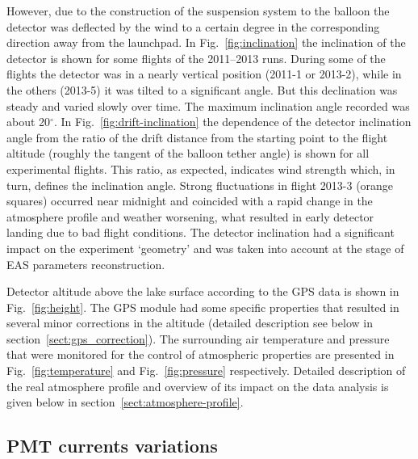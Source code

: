 \documentclass[universe,article,submit,moreauthors,pdftex]{Definitions/mdpi}
\begin{document}
However, due to the construction of the suspension system to the balloon the detector was deflected by the wind to a certain degree in the corresponding direction away from the launchpad. In Fig.~\ref{fig:inclination} the inclination of the detector is shown for some flights of the 2011--2013 runs. During some of the flights the detector was in a nearly vertical position (2011-1 or 2013-2), while in the others (2013-5) it was tilted to a significant angle. But this declination was steady and varied slowly over time. The maximum inclination angle recorded was about 20$^\circ$. In Fig.~\ref{fig:drift-inclination} the dependence of the detector inclination angle from the ratio of the drift distance from the starting point to the flight altitude (roughly the tangent of the balloon tether angle) is shown for all experimental flights. This ratio, as expected, indicates wind strength which, in turn, defines the inclination angle. Strong fluctuations in flight 2013-3 (orange squares) occurred near midnight and coincided with a rapid change in the atmosphere profile and weather worsening, what resulted in early detector landing due to bad flight conditions. The detector inclination had a significant impact on the experiment `geometry' and was taken into account at the stage of EAS parameters reconstruction.

Detector altitude above the lake surface according to the GPS data is shown in Fig.~\ref{fig:height}. The GPS module had some specific properties that resulted in several minor corrections in the altitude (detailed description see below in section~\ref{sect:gps_correction}). The surrounding air temperature and pressure that were monitored for the control of atmospheric properties are presented in Fig.~\ref{fig:temperature} and Fig.~\ref{fig:pressure} respectively. Detailed description of the real atmosphere profile and overview of its impact on the data analysis is given below in section~\ref{sect:atmosphere-profile}.



\subsection{PMT currents variations}
\end{document}
